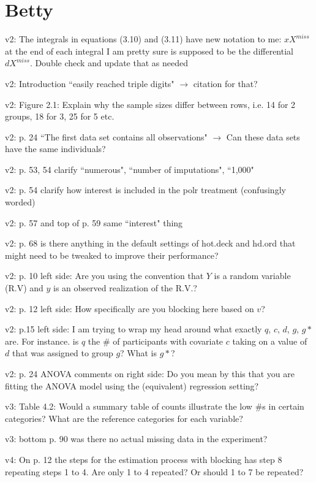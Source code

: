 \documentclass[12pt]{article}
\begin{document}
\section*{Betty}
	\begin{coi}
		\item v2: The integrals in equations (3.10) and (3.11) have new notation to me: $xX^{miss}$ at the end of each integral I am pretty sure is supposed to be the differential $dX^{miss}$. Double check and update that as needed
		\item v2: Introduction ``easily reached triple digits" $\rightarrow$ citation for that?
		\item v2: Figure 2.1: Explain why the sample sizes differ between rows, i.e. 14 for 2 groups, 18 for 3, 25 for 5 etc.
		\item v2: p. 24 ``The first data set contains all observations" $\rightarrow$ Can these data sets have the same individuals?
		\item v2: p. 53, 54 clarify ``numerous", ``number of imputations", ``1,000"
		\item v2: p. 54 clarify how interest is included in the polr treatment (confusingly worded)
		\item v2: p. 57 and top of p. 59 same ``interest" thing
		\item v2: p. 68 is there anything in the default settings of hot.deck and hd.ord that might need to be tweaked to improve their performance?
		\item v2: p. 10 left side: Are you using the convention that $Y$ is a random variable (R.V) and $y$ is an observed realization of the R.V.?
		\item v2: p. 12 left side: How specifically are you blocking here based on $v$?
		\item v2: p.15 left side: I am trying to wrap my head around what exactly $q$, $c$, $d$, $g$, $g*$ are. For instance. is $q$ the \# of participants with covariate $c$ taking on a value of $d$ that was assigned to group $g$? What is $g*$?
		\item v2: p. 24 ANOVA comments on right side: Do you mean by this that you are fitting the ANOVA model using the (equivalent) regression setting?
		\item v3: Table 4.2: Would a summary table of counts illustrate the low \#s in certain categories? What are the reference categories for each variable?
		\item v3: bottom p. 90 was there no actual missing data in the experiment?
		\item v4: On p. 12 the steps for the estimation process with blocking has step 8 repeating steps 1 to 4. Are only 1 to 4 repeated? Or should 1 to 7 be repeated?

\end{coi}
\end{document}
